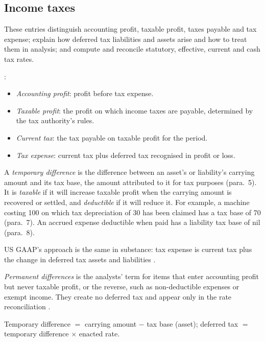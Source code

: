\subsection{Income taxes}

These entries distinguish accounting profit, taxable profit, taxes payable and tax expense; explain how deferred tax liabilities and assets arise and how to treat them in analysis; and compute and reconcile statutory, effective, current and cash tax rates.

\begin{qfdefinition}\label{def:accounting-taxable-profit-differences}
 \citep[IAS~12 para.~5]{eu-2023-1803-ias12}:
\begin{itemize}
\item \emph{Accounting profit}: profit before tax expense.
\item \emph{Taxable profit}: the profit on which income taxes are payable, determined by the tax authority's rules.
\item \emph{Current tax}: the tax payable on taxable profit for the period.
\item \emph{Tax expense}: current tax plus deferred tax recognised in profit or loss.
\end{itemize}
A \emph{temporary difference} is the difference between an asset's or liability's carrying amount and its tax base, the amount attributed to it for tax purposes (para.~5). It is \emph{taxable} if it will increase taxable profit when the carrying amount is recovered or settled, and \emph{deductible} if it will reduce it. For example, a machine costing 100 on which tax depreciation of 30 has been claimed has a tax base of 70 (para.~7). An accrued expense deductible when paid has a liability tax base of nil (para.~8).

US GAAP's approach is the same in substance: tax expense is current tax plus the change in deferred tax assets and liabilities \citep[paras.~16--17]{us-income-taxes-1992}.

\emph{Permanent differences} is the analysts' term for items that enter accounting profit but never taxable profit, or the reverse, such as non-deductible expenses or exempt income. They create no deferred tax and appear only in the rate reconciliation \citep[pp.~369--373, 603]{financial-statement-analysis-2009}.

 Temporary difference $=$ carrying amount $-$ tax base (asset); deferred tax $=$ temporary difference $\times$ enacted rate.


\end{qfdefinition}
